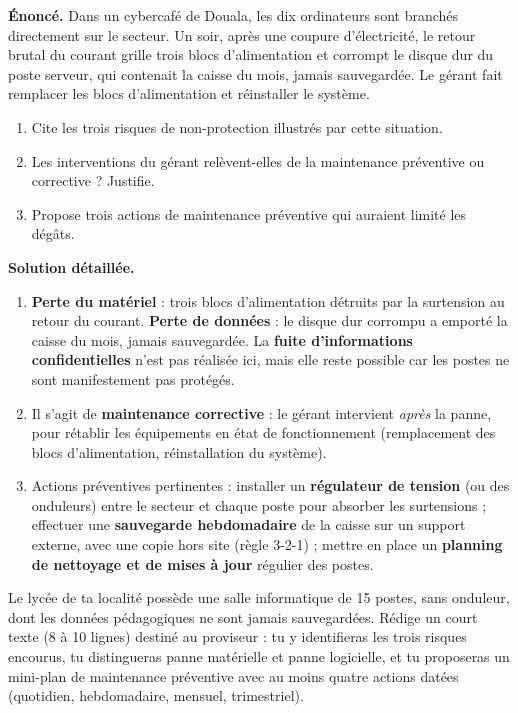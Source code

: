 \documentclass[11pt]{article}
\begin{document}
\begin{exoresolu}
\textbf{Énoncé.} Dans un cybercafé de Douala, les dix ordinateurs sont branchés directement sur le secteur. Un soir, après une coupure d'électricité, le retour brutal du courant grille trois blocs d'alimentation et corrompt le disque dur du poste serveur, qui contenait la caisse du mois, jamais sauvegardée. Le gérant fait remplacer les blocs d'alimentation et réinstaller le système.
\begin{enumerate}
  \item Cite les trois risques de non-protection illustrés par cette situation.
  \item Les interventions du gérant relèvent-elles de la maintenance préventive ou corrective ? Justifie.
  \item Propose trois actions de maintenance préventive qui auraient limité les dégâts.
\end{enumerate}
\tcblower
\textbf{Solution détaillée.}
\begin{enumerate}
  \item \textbf{Perte du matériel} : trois blocs d'alimentation détruits par la surtension au retour du courant. \textbf{Perte de données} : le disque dur corrompu a emporté la caisse du mois, jamais sauvegardée. La \textbf{fuite d'informations confidentielles} n'est pas réalisée ici, mais elle reste possible car les postes ne sont manifestement pas protégés.
  \item Il s'agit de \textbf{maintenance corrective} : le gérant intervient \emph{après} la panne, pour rétablir les équipements en état de fonctionnement (remplacement des blocs d'alimentation, réinstallation du système).
  \item Actions préventives pertinentes : installer un \textbf{régulateur de tension} (ou des onduleurs) entre le secteur et chaque poste pour absorber les surtensions ; effectuer une \textbf{sauvegarde hebdomadaire} de la caisse sur un support externe, avec une copie hors site (règle 3-2-1) ; mettre en place un \textbf{planning de nettoyage et de mises à jour} régulier des postes.
\end{enumerate}
\end{exoresolu}

\begin{exercice}
Le lycée de ta localité possède une salle informatique de 15 postes, sans onduleur, dont les données pédagogiques ne sont jamais sauvegardées. Rédige un court texte (8 à 10 lignes) destiné au proviseur : tu y identifieras les trois risques encourus, tu distingueras panne matérielle et panne logicielle, et tu proposeras un mini-plan de maintenance préventive avec au moins quatre actions datées (quotidien, hebdomadaire, mensuel, trimestriel).
\end{exercice}
\end{document}
